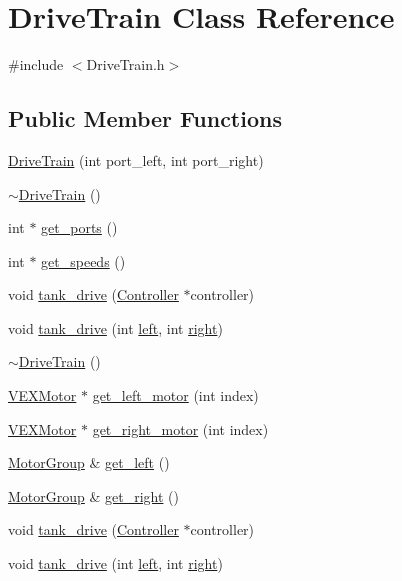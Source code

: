 \hypertarget{class_drive_train}{}\section{Drive\+Train Class Reference}
\label{class_drive_train}


{\ttfamily \#include $<$Drive\+Train.\+h$>$}

\subsection*{Public Member Functions}
\begin{DoxyCompactItemize}
\item 
\hyperlink{class_drive_train_a7c4f19e864e8be8bce01466ee876ad83}{Drive\+Train} (int port\+\_\+left, int port\+\_\+right)
\item 
\hyperlink{class_drive_train_a5dd1c80e30d87655b22974431b16afdf}{$\sim$\+Drive\+Train} ()
\item 
int $\ast$ \hyperlink{class_drive_train_a79742e748af105aa28332142fdc529f7}{get\+\_\+ports} ()
\item 
int $\ast$ \hyperlink{class_drive_train_a50bf393e1ecd61225c78b43e6ffd5fc3}{get\+\_\+speeds} ()
\item 
void \hyperlink{class_drive_train_aaaa020990153f43209fe1114296cc9d5}{tank\+\_\+drive} (\hyperlink{class_controller}{Controller} $\ast$controller)
\item 
void \hyperlink{class_drive_train_a21236fdee1a5a90a41b81ced6548aeb9}{tank\+\_\+drive} (int \hyperlink{class_drive_train_a8343c1e4fad9e5c7e68e627f592e52ea}{left}, int \hyperlink{class_drive_train_a1fe3a54242798b1b88eb437c7c7cf9ad}{right})
\item 
\hyperlink{class_drive_train_a5dd1c80e30d87655b22974431b16afdf}{$\sim$\+Drive\+Train} ()
\item 
\hyperlink{class_v_e_x_motor}{V\+E\+X\+Motor} $\ast$ \hyperlink{class_drive_train_aee8c9a065107209a264b93a7254ca3ee}{get\+\_\+left\+\_\+motor} (int index)
\item 
\hyperlink{class_v_e_x_motor}{V\+E\+X\+Motor} $\ast$ \hyperlink{class_drive_train_a8e2201be0bd64a6ad6215ceed213bcbc}{get\+\_\+right\+\_\+motor} (int index)
\item 
\hyperlink{class_motor_group}{Motor\+Group} \& \hyperlink{class_drive_train_aebe8b0afce2b9b929d90dfbb9f19e311}{get\+\_\+left} ()
\item 
\hyperlink{class_motor_group}{Motor\+Group} \& \hyperlink{class_drive_train_ae07aafb05b73ef4db6952c16f58436ea}{get\+\_\+right} ()
\item 
void \hyperlink{class_drive_train_aaaa020990153f43209fe1114296cc9d5}{tank\+\_\+drive} (\hyperlink{class_controller}{Controller} $\ast$controller)
\item 
void \hyperlink{class_drive_train_a21236fdee1a5a90a41b81ced6548aeb9}{tank\+\_\+drive} (int \hyperlink{class_drive_train_a8343c1e4fad9e5c7e68e627f592e52ea}{left}, int \hyperlink{class_drive_train_a1fe3a54242798b1b88eb437c7c7cf9ad}{right})
\end{DoxyCompactItemize}
